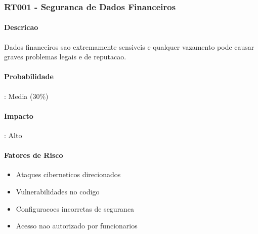 \subsubsection{RT001 - Seguranca de Dados Financeiros}

\paragraph{Descricao}
Dados financeiros sao extremamente sensiveis e qualquer vazamento pode causar graves problemas legais e de reputacao.

\paragraph{Probabilidade}: Media (30\%)
\paragraph{Impacto}: Alto

\paragraph{Fatores de Risco}
\begin{itemize}
    \item Ataques ciberneticos direcionados
    \item Vulnerabilidades no codigo
    \item Configuracoes incorretas de seguranca
    \item Acesso nao autorizado por funcionarios
\end{itemize}

